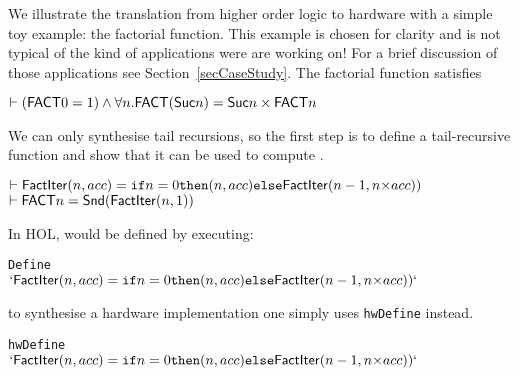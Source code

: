 \documentclass{llncs}
\begin{document}
We illustrate the translation from higher order logic to hardware with a
simple toy example: the factorial function. This example is chosen for
clarity and is not typical of the kind of
applications were are working on!  For a brief discussion of those
applications see Section~\ref{secCaseStudy}.
The factorial function  satisfies

\vspace*{-1mm}

{\baselineskip10pt\begin{alltt}
 \(\vdash (\DEF{FACT} 0 = 1) \wedge {\forall}n. \DEF{FACT}(\DEF{Suc} n) = \DEF{Suc} n \times \DEF{FACT} n\)
\end{alltt}}

\vspace*{-2mm}
We can only synthesise tail recursions, so the first
step is to define a tail-recursive function  and show
that it can be used to compute .

\vspace*{-2mm}

{\baselineskip14pt\begin{alltt}
\( \vdash \DEF{FactIter}(n,acc) = \texttt{if} n=0 \texttt{then} (n,acc) \texttt{else} \DEF{FactIter}(n-1,n{\times}acc)) \)
\( \vdash \DEF{FACT} n = \DEF{Snd}(\DEF{FactIter}(n,1)) \)
\end{alltt}}

\vspace*{-2mm}

\noindent In HOL,  would be defined by executing:

\vspace*{-2mm}

{\baselineskip10pt\begin{alltt}
 Define
\(  `\DEF{FactIter}(n,acc) = \texttt{if} n=0 \texttt{then} (n,acc) \texttt{else} \DEF{FactIter}(n-1,n{\times}acc))`\)
\end{alltt}}

\vspace*{-2mm}

\noindent to synthesise a hardware implementation one simply uses
\texttt{hwDefine} instead.

\vspace*{-2mm}


{\baselineskip10pt\begin{alltt}
 hwDefine
\(  `\DEF{FactIter}(n,acc) = \texttt{if} n=0 \texttt{then} (n,acc) \texttt{else} \DEF{FactIter}(n-1,n{\times}acc))`\)
\end{alltt}}
\end{document}
